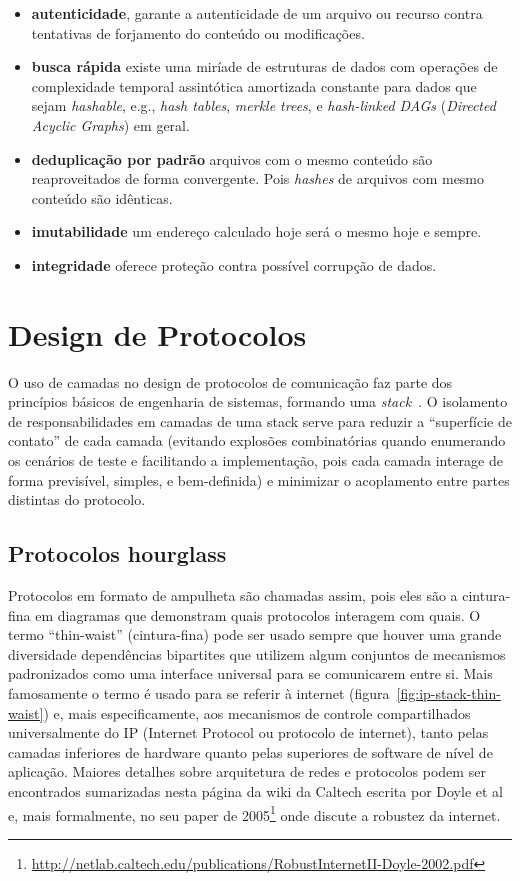 \begin{itemize}
    \item \textbf{autenticidade}, garante a autenticidade de um arquivo ou recurso contra tentativas de forjamento do conteúdo ou modificações.
    \item \textbf{busca rápida} existe uma miríade de estruturas de dados com operações de complexidade temporal assintótica amortizada constante para dados que sejam \textit{hashable}, e.g., \textit{hash tables}, \textit{merkle trees}, e \textit{hash-linked DAGs} (\textit{Directed Acyclic Graphs}) em geral.
    \item \textbf{deduplicação por padrão} arquivos com o mesmo conteúdo são reaproveitados de forma convergente.
          Pois \textit{hashes} de arquivos com mesmo conteúdo são idênticas.
    \item \textbf{imutabilidade} um endereço calculado hoje será o mesmo hoje e sempre.
    \item \textbf{integridade} oferece proteção contra possível corrupção de dados.
\end{itemize}

\section{Design de Protocolos}

O uso de camadas no design de protocolos de comunicação faz parte dos princípios básicos de engenharia de sistemas, formando uma \textit{stack}~\cite{wiki:protocol-design}.
O isolamento de responsabilidades em camadas de uma stack serve para reduzir a ``superfície de contato'' de cada camada (evitando explosões combinatórias quando enumerando os cenários de teste e facilitando a implementação, pois cada camada interage de forma previsível, simples, e bem-definida) e minimizar o acoplamento entre partes distintas do protocolo.

\subsection{Protocolos hourglass\label{subsec:thin-waist}}

Protocolos em formato de ampulheta são chamadas assim, pois eles são a cintura-fina em diagramas que demonstram quais protocolos interagem com quais.
O termo ``thin-waist'' (cintura-fina) pode ser usado sempre que houver uma grande diversidade dependências bipartites que utilizem algum conjuntos de mecanismos padronizados como uma interface universal para se comunicarem entre si.
Mais famosamente o termo é usado para se referir à internet (figura~\ref{fig:ip-stack-thin-waist}) e, mais especificamente, aos mecanismos de controle compartilhados universalmente do IP (Internet Protocol ou protocolo de internet), tanto pelas camadas inferiores de hardware quanto pelas superiores de software de nível de aplicação.
Maiores detalhes sobre arquitetura de redes e protocolos podem ser encontrados sumarizadas nesta página da wiki da Caltech escrita por Doyle et al~\cite{caltech:internet-waist} e, mais formalmente, no seu paper de 2005\footnote{\url{http://netlab.caltech.edu/publications/RobustInternetII-Doyle-2002.pdf}} onde discute a robustez da internet.

